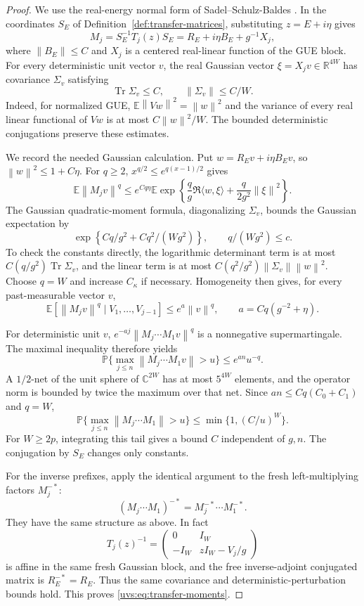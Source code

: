 \documentclass[11pt]{article}
\numberwithin{equation}{section}
\theoremstyle{remark}
\newcommand{\E}{\mathbb E}
\newcommand{\Prob}{\mathbb P}
\newcommand{\C}{\mathbb C}
\newcommand{\R}{\mathbb R}
\newcommand{\Tr}{\operatorname{Tr}}
\newcommand{\norm}[1]{\left\|#1\right\|}
\begin{document}
\begin{proof}
We use the real-energy normal form of Sadel--Schulz-Baldes
\cite[Section~5.1, (22)]{SSB}. In the coordinates $S_E$ of
Definition~\ref{def:transfer-matrices}, substituting $z=E+i\eta$ gives
\[
 M_j=S_E^{-1}T_j(z)S_E=R_E+i\eta B_E+g^{-1}X_j,
\]
where $\norm{B_E}\le C$ and $X_j$ is a
centered real-linear function of the GUE block.
For every deterministic unit vector $v$, the real Gaussian vector
$\xi=X_jv\in\R^{4W}$ has covariance $\Sigma_v$ satisfying
\[
 \Tr\Sigma_v\le C,\qquad
 \norm{\Sigma_v}\le C/W.
\]
Indeed, for normalized GUE,
$\E\norm{Vw}^2=\norm{w}^2$ and the variance of every real linear
functional of $Vw$ is at most $C\norm{w}^2/W$.
The bounded deterministic conjugations preserve these estimates.

We record the needed Gaussian calculation. Put
$w=R_Ev+i\eta B_Ev$, so
$\norm{w}^2\le1+C\eta$. For $q\ge2$,
$x^{q/2}\le e^{q(x-1)/2}$ gives
\[
 \E\norm{M_jv}^q
 \le e^{Cq\eta}
 \E\exp\!\left\{\frac qg\Re\langle w,\xi\rangle
                   +\frac{q}{2g^2}\norm{\xi}^2\right\}.
\]
The Gaussian quadratic-moment formula, diagonalizing $\Sigma_v$,
bounds the Gaussian expectation by
\[
 \exp\!\left\{Cq/g^2+Cq^2/(Wg^2)\right\},
 \qquad q/(Wg^2)\le c.
\]
To check the constants directly, the logarithmic determinant term
is at most $C(q/g^2)\Tr\Sigma_v$, and the linear term is at most
$C(q^2/g^2)\norm{\Sigma_v}\norm{w}^2$.
Choose $q=W$ and increase $C_\kappa$ if necessary. Homogeneity
then gives, for every past-measurable vector $v$,
\begin{equation}\label{uvs:eq:one-step-moment}
 \E[\norm{M_jv}^q\mid V_1,\ldots,V_{j-1}]
 \le e^{a}\norm{v}^q,\qquad
 a=Cq(g^{-2}+\eta).
\end{equation}

For deterministic unit $v$,
$e^{-aj}\norm{M_j\cdots M_1v}^q$ is a nonnegative
supermartingale. The maximal inequality therefore yields
\[
 \Prob\{\max_{j\le n}\norm{M_j\cdots M_1v}>u\}
 \le e^{an}u^{-q}.
\]
A $1/2$-net of the unit sphere of $\C^{2W}$ has at most
$5^{4W}$ elements, and the operator norm is bounded by twice
the maximum over that net. Since $an\le Cq(C_0+C_1)$ and $q=W$,
\begin{equation}\label{uvs:eq:transfer-tail}
 \Prob\{\max_{j\le n}\norm{M_j\cdots M_1}>u\}
 \le\min\{1,(C/u)^W\}.
\end{equation}
For $W\ge2p$, integrating this tail gives a bound $C$
independent of $g,n$. The conjugation by $S_E$ changes only constants.

For the inverse prefixes, apply the identical argument to the
fresh left-multiplying factors $M_j^{-*}$:
\[
 (M_j\cdots M_1)^{-*}=M_j^{-*}\cdots M_1^{-*}.
\]
They have the same structure as above. In fact
\[
 T_j(z)^{-1}=
 \begin{pmatrix}0&I_W\\-I_W&zI_W-V_j/g\end{pmatrix}
\]
is affine in the same fresh Gaussian block, and the free
inverse-adjoint conjugated matrix is $R_E^{-*}=R_E$.
Thus the same covariance and deterministic-perturbation bounds
hold. This proves \eqref{uvs:eq:transfer-moments}.
\end{proof}
\end{document}
